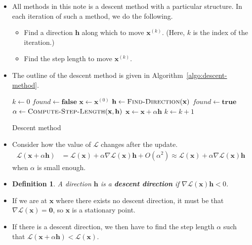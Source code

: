 \documentclass[10pt]{article}
\newtheorem{definition}[lemma]{Definition}
\newcommand{\ve}[1]{\mathbf{#1}}
\newcommand{\mcal}[1]{\mathcal{#1}}
\begin{document}
\begin{itemize}
    \item All methods in this note is a descent method with a particular structure. In each iteration of such a method, we do the following.
    \begin{itemize}
        \item Find a direction $\ve{h}$ along which to move $\ve{x}^{(k)}$. (Here, $k$ is the index of the iteration.)
        \item Find the step length to move $\ve{x}^{(k)}$.
    \end{itemize}
    
    \item The outline of the descent method is given in Algorithm~\ref{algo:descent-method}.
    
    \begin{algorithm}[t]
    \begin{algorithmic}
        \State $k \gets 0$
        \State $found \gets \mathbf{false}$
        \State $\ve{x} \gets \ve{x}^{(0)}$
            \State $\ve{h} \gets \Call{Find-Direction}{\ve{x}}$
            \If {(no such $\ve{h}$ exists)}
                \State $found \gets \mathbf{true}$
            \Else
                \State $\alpha \gets \Call{Compute-Step-Length}{\ve{x}, \ve{h}}$
                \State $\ve{x} \gets \ve{x} + \alpha\ve{h}$
                \State $k \gets k+1$
            \EndIf
        \EndWhile
    \end{algorithmic}
    \caption{Descent method}
    \label{algo:descent-method}
    \end{algorithm}

    \item Consider how the value of $\mcal{L}$ changes after the update.
    \begin{align*}
        \mcal{L}(\ve{x} + \alpha \ve{h}) 
        &= \mcal{L}(\ve{x}) + \alpha \nabla \mcal{L}(\ve{x}) \ve{h} + O(\alpha^2) 
        \approx \mcal{L}(\ve{x}) + \alpha \nabla \mcal{L}(\ve{x}) \ve{h}
    \end{align*}
    when $\alpha$ is small enough. 
    
    \item \begin{definition}
        A direction $\ve{h}$ is a {\bf descent direction} if $\nabla \mcal{L}(\ve{x}) \ve{h} < 0$.
    \end{definition}

    \item If we are at $\ve{x}$ where there exists no descent direction, it must be that $\nabla \mcal{L}(\ve{x}) = \ve{0}$, so $\ve{x}$ is a stationary point.
    
    \item If there is a descent direction, we then have to find the step length $\alpha$ such that $\mcal{L}(\ve{x} + \alpha \ve{h}) < \mcal{L}(\ve{x}).$ 
\end{itemize}
\end{document}
